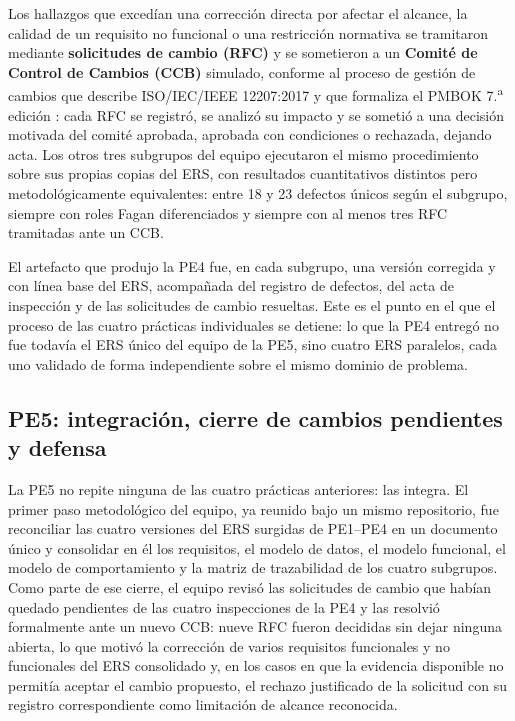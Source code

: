 \documentclass[journal,onecolumn]{IEEEtran}
\begin{document}
Los hallazgos que excedían una corrección directa por afectar el alcance, la calidad de un requisito no
funcional o una restricción normativa se tramitaron mediante \textbf{solicitudes de
	cambio (RFC)} y se sometieron a un \textbf{Comité de Control de Cambios (CCB)} simulado,
conforme al proceso de gestión de cambios que describe ISO/IEC/IEEE 12207:2017
\cite{iso12207} y que formaliza el PMBOK 7.\textsuperscript{a} edición \cite{pmbok7}: cada
RFC se registró, se analizó su impacto y se sometió a una decisión motivada del comité
aprobada, aprobada con condiciones o rechazada, dejando acta. Los otros tres subgrupos
del equipo ejecutaron el mismo procedimiento sobre sus propias copias del ERS, con
resultados cuantitativos distintos pero metodológicamente equivalentes: entre 18 y 23
defectos únicos según el subgrupo, siempre con roles Fagan diferenciados y siempre con al
menos tres RFC tramitadas ante un CCB.

El artefacto que produjo la PE4 fue, en cada subgrupo, una versión corregida y con línea
base del ERS, acompañada del registro de defectos, del acta de inspección y de las
solicitudes de cambio resueltas. Este es el punto en el que el proceso de las cuatro
prácticas individuales se detiene: lo que la PE4 entregó no fue todavía el ERS único del
equipo de la PE5, sino cuatro ERS paralelos, cada uno validado de forma independiente sobre
el mismo dominio de problema.

\subsection{PE5: integración, cierre de cambios pendientes y defensa}

La PE5 no repite ninguna de las cuatro prácticas anteriores: las integra. El primer paso
metodológico del equipo, ya reunido bajo un mismo repositorio, fue reconciliar las cuatro
versiones del ERS surgidas de PE1--PE4 en un documento único y consolidar en él los
requisitos, el modelo de datos, el modelo funcional, el modelo de comportamiento y la
matriz de trazabilidad de los cuatro subgrupos. Como parte de ese cierre, el equipo revisó
las solicitudes de cambio que habían quedado pendientes de las cuatro inspecciones de la
PE4 y las resolvió formalmente ante un nuevo CCB: nueve RFC fueron decididas sin dejar
ninguna abierta, lo que motivó la corrección de varios requisitos funcionales y no
funcionales del ERS consolidado y, en los casos en que la evidencia disponible no permitía
aceptar el cambio propuesto, el rechazo justificado de la solicitud con su registro
correspondiente como limitación de alcance reconocida. 
\end{document}
